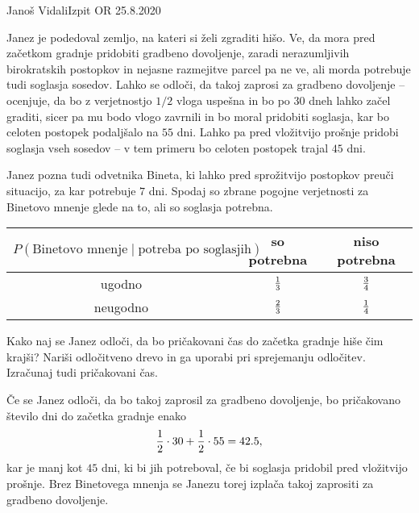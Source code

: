 \begin{naloga}{Janoš Vidali}{Izpit OR 25.8.2020}
\begin{vprasanje}
Janez je podedoval zemljo, na kateri si želi zgraditi hišo.
Ve, da mora pred začetkom gradnje pridobiti gradbeno dovoljenje,
zaradi nerazumljivih birokratskih postopkov
in nejasne razmejitve parcel pa ne ve,
ali morda potrebuje tudi soglasja sosedov.
Lahko se odloči, da takoj zaprosi za gradbeno dovoljenje
-- ocenjuje,
da bo z verjetnostjo $1/2$ vloga uspešna in bo po $30$ dneh lahko začel graditi,
sicer pa mu bodo vlogo zavrnili in bo moral pridobiti soglasja,
kar bo celoten postopek podaljšalo na $55$ dni.
Lahko pa pred vložitvijo prošnje pridobi soglasja vseh sosedov
-- v tem primeru bo celoten postopek trajal $45$ dni.

Janez pozna tudi odvetnika Bineta,
ki lahko pred sprožitvijo postopkov preuči situacijo,
za kar potrebuje $7$ dni.
Spodaj so zbrane pogojne verjetnosti za Binetovo mnenje glede na to,
ali so soglasja potrebna.

\begin{center}
    \setlength{\extrarowheight}{2pt}
    \begin{tabular}{c|cc}
        $P(\text{Binetovo mnenje} \mid \text{potreba po soglasjih})$
        & so potrebna & niso potrebna \\ \hline
        ugodno & ${1 \over 3}$ & ${3 \over 4}$ \\
        neugodno & ${2 \over 3}$ & ${1 \over 4}$
    \end{tabular}
\end{center}

Kako naj se Janez odloči,
da bo pričakovani čas do začetka gradnje hiše čim krajši?
Nariši odločitveno drevo in ga uporabi pri sprejemanju odločitev.
Izračunaj tudi pričakovani čas.
\end{vprasanje}

\begin{odgovor}
Če se Janez odloči, da bo takoj zaprosil za gradbeno dovoljenje,
bo pričakovano število dni do začetka gradnje enako
$$
{1 \over 2} \cdot 30 + {1 \over 2} \cdot 55 = 42.5,
$$
kar je manj kot $45$ dni, ki bi jih potreboval,
če bi soglasja pridobil pred vlo\-žit\-vi\-jo prošnje.
Brez Binetovega mnenja
se Janezu torej izplača takoj zaprositi za gradbeno dovoljenje.


\end{odgovor}
\end{naloga}
